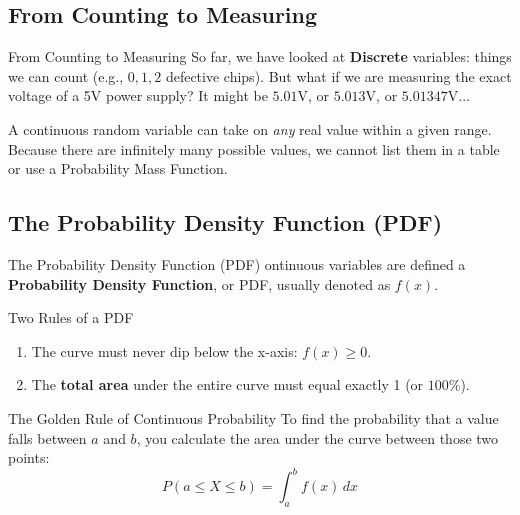 \subsection{From Counting to Measuring}
\begin{frame}{From Counting to Measuring}
    So far, we have looked at \textbf{Discrete} variables: things we can count (e.g., $0, 1, 2$ defective chips). 
    But what if we are measuring the exact voltage of a 5V power supply? It might be $5.01\text{V}$, or $5.013\text{V}$, or $5.01347\text{V}\dots$
    
    \begin{definition}
        A continuous random variable can take on \textit{any} real value within a given range. Because there are infinitely many possible values, we cannot list them in a table or use a Probability Mass Function.
    \end{definition}

\end{frame}

\subsection{The Probability Density Function (PDF)}
\begin{frame}{The Probability Density Function (PDF)}
    ontinuous variables are defined a \textbf{Probability Density Function}, or PDF, usually denoted as $f(x)$.

    \begin{block}{Two Rules of a PDF}
        \begin{enumerate}
            \item The curve must never dip below the x-axis: $f(x) \geq 0$.
            \item The \textbf{total area} under the entire curve must equal exactly 1 (or $100\%$).
        \end{enumerate}
    \end{block}

    \pause 
    \begin{alertblock}{The Golden Rule of Continuous Probability}
        To find the probability that a value falls between $a$ and $b$, you calculate the area under the curve between those two points:
        \[ P(a \leq X \leq b) = \int_{a}^{b} f(x) \,dx \]
    \end{alertblock}
\end{frame}

